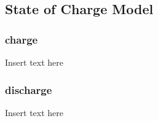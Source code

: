 \subsection{State of Charge Model}
\subsubsection{charge}
Insert text here
\subsubsection{discharge}
Insert text here
